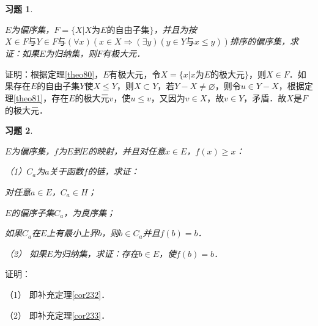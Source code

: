 \documentclass[12pt, a4paper, oneside]{book}
\newtheorem{exer}{习题}
\begin{document}
			\begin{exer}\label{exer105}
				\hfill\par
				$E$为偏序集，$F=\{X|X\text{为}E\text{的自由子集}\}$，并且为按$X\in F\text{与}Y\in F\text{与}(\forall x)(x\in X\Rightarrow (\exists y)(y\in Y\text{与}x\leq y))$排序的偏序集，求证：如果$E$为归纳集，则$F$有极大元．
			\end{exer}
			证明：根据定理\ref{theo80}，$E$有极大元，令$X=\{x|x\text{为}E\text{的极大元}\}$，则$X\in F$．如果存在$E$的自由子集$Y$使$X\leq Y$，则$X\subset Y$，若$Y-X\neq \varnothing$，则令$u\in Y-X$，根据定理\ref{theo81}，存在$E$的极大元$v$，使$u\leq v$，又因为$v\in X$，故$v\in Y$，矛盾．故$X$是$F$的极大元．
						
			\begin{exer}\label{exer106}
				\hfill\par
				$E$为偏序集，$f$为$E$到$E$的映射，并且对任意$x\in E$，$f(x)\geq x$：
				\par
				（1）$C_a$为$a$关于函数$f$的链，求证：
				\par
				对任意$a\in E$，$C_a\in H$；
				\par
				$E$的偏序子集$C_a$，为良序集；
				\par
				如果$C_a$在$E$上有最小上界$b$，则$b\in C_a$并且$f(b)=b$．
				\par
				（2）	如果$E$为归纳集，求证：存在$b\in E$，使$f(b)=b$．
			\end{exer}
			证明：
			\par
			（1）	即补充定理\ref{cor232}．
			\par
			（2）	即补充定理\ref{cor233}．
						
\end{document}
